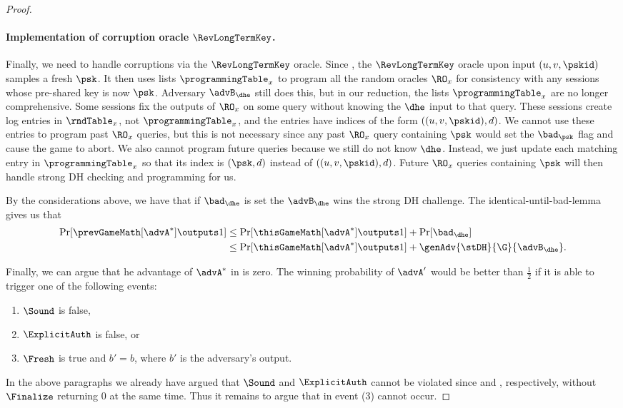 \begin{proof}
	\paragraph{Implementation of corruption oracle $\RevLongTermKey$.} Finally, we need to handle corruptions via the $\RevLongTermKey$ oracle.
	Since , the $\RevLongTermKey$ oracle upon input $(u, v, \pskid)$ samples a fresh $\psk$.
	It then uses lists $\programmingTable_x$ to program all the random oracles $\RO_{x}$ for consistency with any sessions whose pre-shared key is now $\psk$. 
	Adversary $\advB_\dhe$ still does this, but in our reduction, the lists $\programmingTable_x$ are no longer comprehensive. 
	Some sessions fix the outputs of $\RO_{x}$ on some query without knowing the $\dhe$ input to that query. 
	These sessions create log entries in $\rndTable_x$, not $\programmingTable_x$, and the entries have indices of the form $((u,v,\pskid), d)$. 
	We cannot use these entries to program past $\RO_x$ queries, but this is not necessary since any past $\RO_x$ query containing $\psk$ would set the $\bad_{\psk}$ flag and cause the game to abort.
	We also cannot program future queries because we still do not know $\dhe$. 
	Instead, we just update each matching entry in $\programmingTable_x$ so that its index is $(\psk, d)$ instead of $((u, v, \pskid), d)$. 
	Future $\RO_x$ queries containing $\psk$ will then handle strong DH checking and programming for us.


	By the considerations above, we have that if $\bad_\dhe$ is set the $\advB_\dhe$ wins the strong DH challenge.
	The identical-until-bad-lemma gives us that
	\begin{align} \nonumber
		\Pr[ \prevGameMath[\advA^*] \outputs 1 ] &\leq \Pr[ \thisGameMath[\advA^*] \outputs 1 ] + \Pr[ \bad_\dhe ] \\
		&\leq \Pr[ \thisGameMath[\advA^*] \outputs 1 ] + \genAdv{\stDH}{\G}{\advB_\dhe}.
	\end{align}

	Finally, we can argue that he advantage of $\advA^\ast$ in \thisGame is zero.
	The winning probability of $\advA'$ would be better than $\tfrac{1}{2}$ if it is able to trigger one of the following events:
	\begin{enumerate}
		\item $\Sound$ is false,
		\item $\ExplicitAuth$ is false, or
		\item $\Fresh$ is true and $b' = b$, where $b'$ is the adversary's output.
	\end{enumerate}
	In the above paragraphs we already have argued that $\Sound$ and $\ExplicitAuth$ cannot be violated since  and , respectively, without $\Finalize$ returning $0$ at the same time.
	Thus it remains to argue that in \thisGame event (3) cannot occur.
	

\end{proof}
